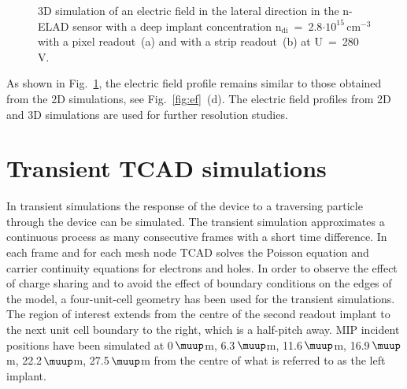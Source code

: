 \documentclass[a4paper,11pt]{article}
\begin{document}
\begin{figure}[t!]
\begin{center}
\begin{minipage}[h]{0.1\linewidth}
\begin{tikzpicture}
					    \end{tikzpicture}
		\end{minipage}
\hfill 
\caption{3D simulation of an electric field in the lateral direction in the n-ELAD sensor with a deep implant concentration $\mathrm{n_{di}}$~=~2.8$\mathrm{\cdot10^{15}\,cm^{-3}}$ with a pixel readout~(a) and with a strip readout~(b) at U~=~280\,V.}
\label{fig:3d}
\end{center}
\end{figure}
As shown in Fig.~\ref{fig:3d}, the electric field profile remains similar to those obtained from the 2D simulations, see Fig.~\ref{fig:ef}~(d). 
The electric field profiles from 2D and 3D simulations are used for further resolution studies.
\section{Transient TCAD simulations}
\label{sec:tr}
In transient simulations the response of the device to a traversing particle through the device can be simulated. 
The transient simulation approximates a continuous process as many consecutive frames with a short time difference. 
In each frame and for each mesh node TCAD solves the Poisson equation and carrier continuity equations for electrons and holes.
In order to observe the effect of charge sharing and to avoid the effect of boundary conditions on the edges of the model, a four-unit-cell geometry has been used for the transient simulations. 
The region of interest extends from the centre of the second readout implant to the next unit cell boundary to the right, which is a half-pitch away.  
MIP incident positions have been simulated at 0\,$\muup$m, 6.3\,$\muup$m, 11.6\,$\muup$m, 16.9\,$\muup$m, 22.2\,$\muup$m, 27.5\,$\muup$m from the centre of what is referred to as the left implant.
\end{document}
